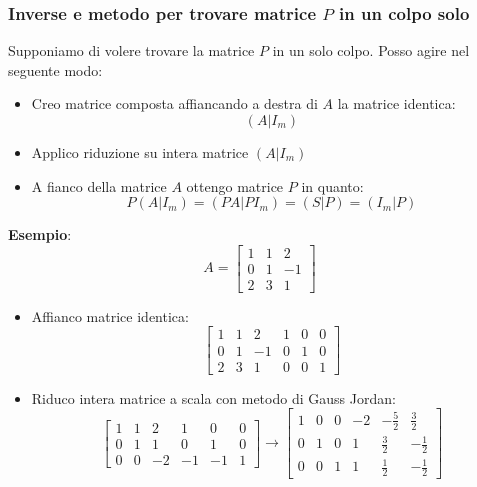 \documentclass[12pt,a4paper,oneside]{article}
\begin{document}
\subsubsection*{Inverse e metodo per trovare matrice $P$ in un colpo solo}
Supponiamo di volere trovare la matrice $P$ in un solo colpo. Posso agire nel seguente modo:
\begin{itemize}
	\item Creo matrice composta affiancando a destra di $A$ la matrice identica:
	      \[
		      \left( A|I_m \right)
	      \]
	\item Applico riduzione su intera matrice $ \left( A|I_m \right) $
	\item A fianco della matrice $A$ ottengo matrice $P$ in quanto:
	      \[
		      P\left( A|I_m \right) = \left( PA |PI_m \right) = \left( S| P \right) = \left( I_m | P\right)
	      \]
\end{itemize}
\textbf{Esempio}:
\[
	A= \begin{bmatrix}
		1 & 1 & 2  \\
		0 & 1 & -1 \\
		2 & 3 & 1
	\end{bmatrix}
\]
\begin{itemize}
	\item Affianco matrice identica:
	      \[
		      \begin{bmatrix}
			      1 & 1 & 2  & 1 & 0 & 0 \\
			      0 & 1 & -1 & 0 & 1 & 0 \\
			      2 & 3 & 1  & 0 & 0 & 1
		      \end{bmatrix}
	      \]
	\item Riduco intera matrice a scala con metodo di Gauss Jordan:
	      \[
		      \begin{bmatrix}
			      1 & 1 & 2  & 1  & 0  & 0 \\
			      0 & 1 & 1  & 0  & 1  & 0 \\
			      0 & 0 & -2 & -1 & -1 & 1
		      \end{bmatrix}
		      \rightarrow
		      \begin{bmatrix}
			      1 & 0 & 0 & -2 & - \frac{5}{2} & \frac{3}{2}  \\
			      0 & 1 & 0 & 1  & \frac{3}{2}   & -\frac{1}{2} \\
			      0 & 0 & 1 & 1  & \frac{1}{2}   & -\frac{1}{2}
		      \end{bmatrix}
	      \]
\end{itemize}
\end{document}
